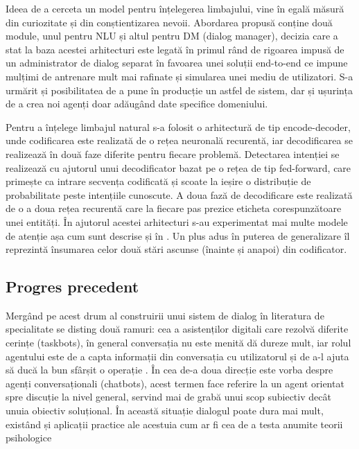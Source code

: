 Ideea de a cerceta un model pentru înțelegerea limbajului, vine în egală măsură din curiozitate și din conștientizarea nevoii. Abordarea propusă conține două module, unul pentru NLU și altul pentru DM (dialog manager), decizia care a stat la baza acestei arhitecturi este legată în primul rând de rigoarea impusă de un administrator de dialog separat în favoarea unei soluții end-to-end ce impune mulțimi de antrenare mult mai rafinate și simularea unei mediu de utilizatori. S-a urmărit și posibilitatea de a pune în producție un astfel de sistem, dar și ușurința de a crea noi agenți doar adăugând date specifice domeniului.


Pentru a înțelege limbajul natural s-a folosit o arhitectură de tip encode-decoder, unde codificarea este realizată de o rețea neuronală recurentă, iar decodificarea se realizează în două faze diferite pentru fiecare problemă. Detectarea intenției se realizează cu ajutorul unui decodificator bazat pe o rețea de tip fed-forward, care primește ca intrare secvența codificată și scoate la ieșire o distribuție de probabilitate peste intențiile cunoscute. A doua fază de decodificare este realizată de o a doua rețea recurentă care la fiecare pas prezice eticheta corespunzătoare unei entități. În ajutorul acestei arhitecturi s-au experimentat mai multe modele de atenție așa cum sunt descrise și în \cite{trans_luong_manning}. Un plus adus în puterea de generalizare îl reprezintă însumarea celor două stări ascunse (înainte și anapoi) din codificator.


\subsection{Progres precedent}
Mergând pe acest drum al construirii unui sistem de dialog în literatura de specialitate se disting două ramuri: cea a asistenților digitali care rezolvă diferite cerințe (taskbots), în general conversația nu este menită dă dureze mult, iar rolul agentului este de a capta informații din conversația cu utilizatorul și de a-l ajuta să ducă la bun sfârșit o operație \cite{joint_online_bing, att_joint_bing}. În cea de-a doua direcție este vorba despre agenți conversaționali (chatbots), acest termen face referire la un agent orientat spre discuție la nivel general, servind mai de grabă unui scop subiectiv decât unuia obiectiv soluțional. În această situație dialogul poate dura mai mult, existând și aplicații practice ale acestuia cum ar fi cea de a testa anumite teorii psihologice \cite{weizenbaum}

